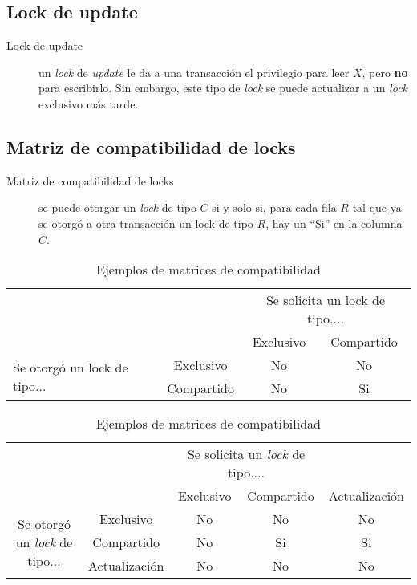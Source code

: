 \documentclass[a4paper, twoside]{article}
\begin{document}
\subsection{Lock de update}
\begin{description}
	\item[Lock de update] un \emph{lock} de \emph{update} le da a una transacción el privilegio para leer $X$, pero \textbf{no} para escribirlo. Sin embargo, este tipo de \emph{lock} se puede actualizar a un \emph{lock} exclusivo más tarde.
\end{description}

\subsection{Matriz de compatibilidad de locks}
\begin{description}
	\item[Matriz de compatibilidad de locks] se puede otorgar un \emph{lock} de tipo $C$ si y solo si, para cada fila $R$ tal que ya se otorgó a otra transacción un lock de tipo $R$, hay un ``Si'' en la columna $C$.
\end{description}

\begin{table}[H]
	\centering
	\begin{subtable}{0.9\textwidth}
		\centering
		\begin{tabular}{|l|c|c|c|}
			\cline{3-4} 
			\multicolumn{1}{l}{} &  & \multicolumn{2}{c|}{Se solicita un lock de tipo....}\\
			\cline{3-4} 
			\multicolumn{1}{l}{} &  & Exclusivo & Compartido\\
			\hline 
			\multirow{2}{*}{Se otorgó un lock de tipo...} & Exclusivo & No & No\\
			\cline{2-4} 
			 & Compartido & No & Si\\
			\hline 
		\end{tabular}
		\caption{Para locks compartidos y exclusivos}
	\end{subtable}

	\begin{subtable}{0.9\textwidth}
		\centering
		\begin{tabular}{|c|c|c|c|c|}
			\cline{3-5} 
			\multicolumn{1}{c}{} &  & \multicolumn{2}{c}{Se solicita un \emph{lock} de tipo....} & \\
			\cline{3-5} 
			\multicolumn{1}{c}{} &  & Exclusivo & Compartido & Actualización\\
			\hline 
			\multirow{3}{*}{Se otorgó un \emph{lock} de tipo...} & Exclusivo & No & No & No\\
			\cline{2-5} 
			 & Compartido & No & Si & Si\\
			\cline{2-5} 
			 & Actualización & No & No & No\\
			\hline 
		\end{tabular}
		\caption{Para locks compartidos, exclusivos y de actualización}
	\end{subtable}
	\caption{Ejemplos de matrices de compatibilidad}
\end{table}
\end{document}
